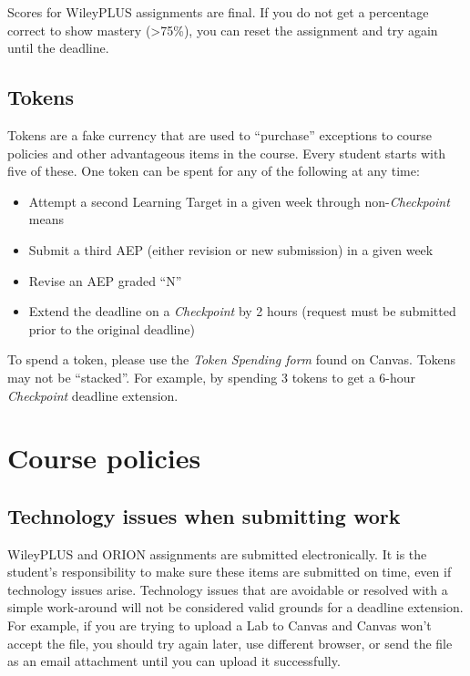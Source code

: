 Scores for WileyPLUS assignments are final. If you do not get a
percentage correct to show mastery (\textgreater75\%), you can reset the
assignment and try again until the deadline.

\hypertarget{tokens}{%
\subsection{Tokens}\label{tokens}}

Tokens are a fake currency that are used to ``purchase'' exceptions to
course policies and other advantageous items in the course. Every
student starts with five of these. One token can be spent for any of the
following at any time:

\begin{itemize}
\tightlist
\item
  Attempt a second Learning Target in a given week through
  non-\emph{Checkpoint} means
\item
  Submit a third AEP (either revision or new submission) in a given week
\item
  Revise an AEP graded ``N''
\item
  Extend the deadline on a \emph{Checkpoint} by 2 hours (request must be
  submitted prior to the original deadline)
\end{itemize}

To spend a token, please use the \emph{Token Spending form} found on
Canvas. Tokens may not be ``stacked''. For example, by spending 3 tokens
to get a 6-hour \emph{Checkpoint} deadline extension.

\hypertarget{course-policies}{%
\section{Course policies}\label{course-policies}}

\hypertarget{technology-issues-when-submitting-work}{%
\subsection{Technology issues when submitting
work}\label{technology-issues-when-submitting-work}}

WileyPLUS and ORION assignments are submitted electronically. It is the
student's responsibility to make sure these items are submitted on time,
even if technology issues arise. Technology issues that are avoidable or
resolved with a simple work-around will not be considered valid grounds
for a deadline extension. For example, if you are trying to upload a Lab
to Canvas and Canvas won't accept the file, you should try again later,
use different browser, or send the file as an email attachment until you
can upload it successfully.

